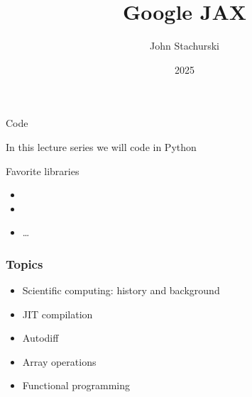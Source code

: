 

\title{Google JAX}


\author{John Stachurski}


\date{2025}




\begin{frame}
  \titlepage
\end{frame}


\begin{frame}{Code}

    In this lecture series we will code in Python

    \pause

        \vspace{0.5em}
        \vspace{0.5em}
    Favorite libraries

    \begin{itemize}
        \item {}
        \vspace{0.2em}
        \item {}
        \vspace{0.2em}
        \item {}\ldots
        \vspace{0.2em}
    \end{itemize}

\end{frame}


\begin{frame}
    \frametitle{Topics}

    \begin{itemize}
        \item Scientific computing: history and background
        \vspace{0.5em}
        \item JIT compilation
        \vspace{0.5em}
        \item Autodiff
        \vspace{0.5em}
        \item Array operations
        \vspace{0.5em}
        \item Functional programming
    \end{itemize}

\end{frame}


